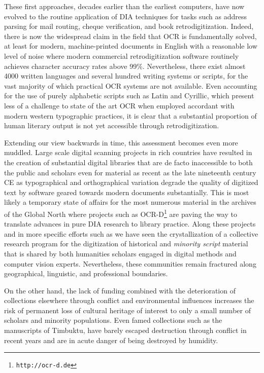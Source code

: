 These first approaches, decades earlier than the earliest computers, have now
evolved to the routine application of DIA techniques for tasks such as address
parsing for mail routing, cheque verification, and book retrodigitization.
Indeed, there is now the widespread claim in the field that OCR is
fundamentally solved, at least for modern, machine-printed documents in English
with a reasonable low level of noise where modern commercial retrodigitization
software routinely achieves character accuracy rates above 99\%. Nevertheless,
there exist almost 4000 written languages and several hundred writing systems
or scripts, for the vast majority of which practical OCR systems are not
available. Even accounting for the use of purely alphabetic scripts such as
Latin and Cyrillic, which present less of a challenge to state of the art OCR
when employed accordant with modern western typographic practices, it is clear
that a substantial proportion of human literary output is not yet accessible
through retrodigitization.

Extending our view backwards in time, this assessment becomes even more
muddled. Large scale digital scanning projects in rich countries have resulted
in the creation of substantial digital libraries that are de facto inaccessible
to both the public and scholars even for material as recent as the late
nineteenth century CE as typographical and orthographical variation degrade the
quality of digitized text by software geared towards modern documents
substantially. This is most likely a temporary state of affairs for the most
numerous material in the archives of the Global North where projects such as
OCR-D\footnote{\texttt{http://ocr-d.de}} are paving the way to translate
advances in pure DIA research to library practice. Along these projects and in
more specific efforts such as \cite{smith2018research} we have seen the
crystallization of a collective research program for the digitization of
historical and \emph{minority script} material that is shared by both
humanities scholars engaged in digital methods and computer vision experts.
Nevertheless, these communities remain fractured along geographical,
linguistic, and professional boundaries.

On the other hand, the lack of funding combined with the deterioration of
collections elsewhere through conflict and environmental influences increases
the risk of permanent loss of cultural heritage of interest to only a small
number of scholars and minority populations. Even famed collections such as the
manuscripts of Timbuktu, have barely escaped destruction through conflict in
recent years and are in acute danger of being destroyed by humidity. 

